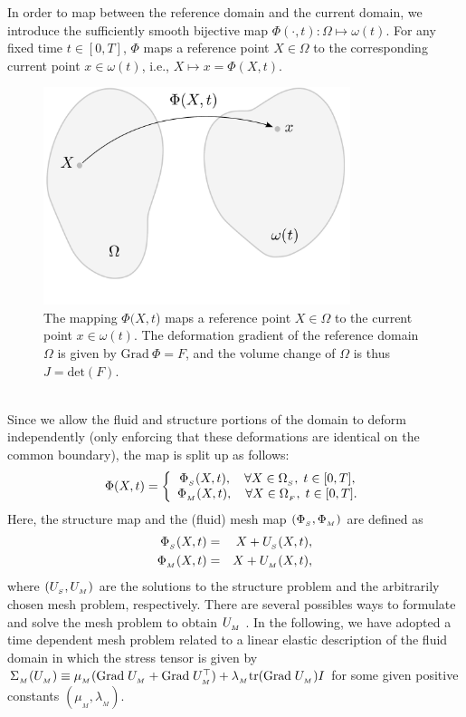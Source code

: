 In order to map between the reference domain and the current domain,
we introduce the sufficiently smooth bijective map $\Phi(\cdot,
t):\Omega\mapsto \omega(t)$.  For any fixed time $t\in[0,T]$, $\Phi$
maps a reference point $X\in\Omega$ to the corresponding current
point $x\in\omega(t)$, i.e., $X \mapsto x = \Phi(X,t)$.
\begin{figure}
  \includegraphics[width=0.8\textwidth]{chapters/selim/pdf/mapping.pdf}
 \caption{The mapping $\Phi(X,t$) maps a reference point $X\in\Omega$
   to the current point $x\in\omega(t)$. The deformation gradient of
   the reference domain $\Omega$ is given by $\textrm{Grad}\:\Phi =
   F$, and the volume change of $\Omega$ is thus $J = \textrm{det}(F)$.}
 \label{selim:fig:mapping}
\end{figure}
\\
Since we allow the fluid and structure portions of the domain to
deform independently (only enforcing that these deformations are
identical on the common boundary), the map is split up as follows:
\begin{equation}
\label{selim:eq:ALEmapI}
\Phi(X,t) =
\left\{
\begin{array}{ccc}
\Phi_{_{S}}(X, t), \quad \forall X\in\Omega_{_{S}},\; t\in[0,T],\\
\Phi_{_{M}}(X, t), \quad \forall X\in\Omega_{_{F}},\; t\in[0,T].
\end{array}
\right.
\end{equation}
Here, the structure map and the (fluid) mesh map $(\Phi_{_{S}}, \Phi_{_{M}})$ are
defined as
\begin{eqnarray}
\label{selim:eq:ALEmapII}
\Phi_{_{S}}(X, t) &=& X + U_{_{S}}(X,t),\\
\Phi_{_{M}}(X, t) &=& X + U_{_{M}}(X,t),
\end{eqnarray}
where $(U_{_{S}}, U_{_{M}})$ are the solutions to the structure problem and the
arbitrarily chosen mesh problem, respectively.  There are several
possibles ways to formulate and solve the mesh problem to obtain
$U_{_{M}}$ \citep{HermanssonHansbo2003, LopezNigroStorti2008}.  In the
following, we have adopted a time dependent mesh problem related to a
linear elastic description of the fluid domain in which the stress
tensor is given by $\Sigma_{_{M}}(U_{_{M}})\equiv \mu_{{_M}}(\textrm{Grad}\;U_{_{M}} +
\textrm{Grad}\;U_{_{M}}^{\top})+ \lambda_{_{M}}\textrm{tr}(\textrm{Grad}\;U_{_{M}})I$ for some given
positive constants $(\mu_{{_M}},\lambda_{_{M}})$.


